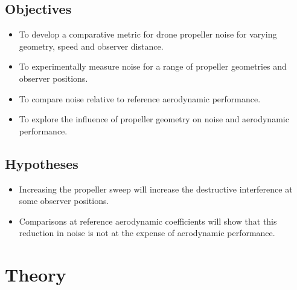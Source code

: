 \documentclass[12pt,a4paper]{article}
\begin{document}



\subsection{Objectives}



\begin{itemize}
    \item To develop a comparative metric for drone propeller noise for varying geometry, speed and observer distance.
    \item To experimentally measure noise for a range of propeller geometries and observer positions.
    \item To compare noise relative to reference aerodynamic performance.
    \item To explore the influence of propeller geometry on noise and aerodynamic performance.
\end{itemize}

\subsection{Hypotheses}

\begin{itemize}
    \item Increasing the propeller sweep will increase the destructive interference at some observer positions.
    \item Comparisons at reference aerodynamic coefficients will show that this reduction in noise is not at the expense of aerodynamic performance.
\end{itemize}

\section{Theory}
\end{document}

